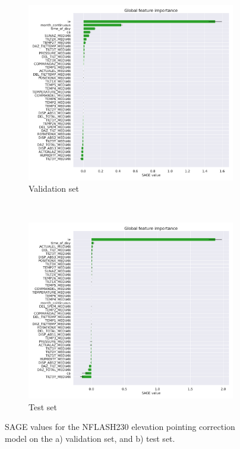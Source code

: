 \begin{figure}[H]
    \centering
    \begin{subfigure}[t]{0.92\textwidth}
        \centering
        \includegraphics[width=\textwidth]{Results/XGB_ds2_tp5_k40_uncorr_el_val_SAGE.pdf}
        \caption{Validation set}
        \label{subfig:sage_lastfold_nflash230_el_val}
    \end{subfigure}
    \\
    \begin{subfigure}[t]{0.92\textwidth}
       \centering
       \includegraphics[width=1\textwidth]{Results/XGB_ds2_tp5_k40_uncorr_el_test_SAGE.pdf}
       \caption{Test set}
       \label{subfig:sage_lastfold_nflash230_el_test}
    \end{subfigure}
    \caption{SAGE values for the NFLASH230 elevation pointing correction model on the a) validation set, and b) test set.}
    \label{fig:sage_lastfold_nflash230_el}
\end{figure}





